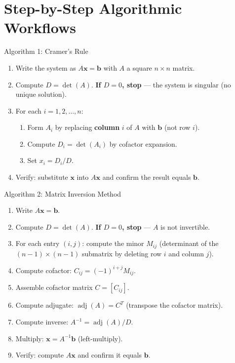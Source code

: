 \documentclass[12pt,a4paper]{article}
\begin{document}
\section{Step-by-Step Algorithmic Workflows}

\begin{learnbox}{Algorithm 1: Cramer's Rule}
\begin{enumerate}[noitemsep]
  \item Write the system as \(A\mathbf{x} = \mathbf{b}\) with \(A\) a square \(n\times n\) matrix.
  \item Compute \(D = \det(A)\). \textbf{If \(D = 0\), stop} --- the system is singular (no unique solution).
  \item For each \(i = 1, 2, \ldots, n\):
  \begin{enumerate}[noitemsep, label=\alph*.]
    \item Form \(A_i\) by replacing \textbf{column} \(i\) of \(A\) with \(\mathbf{b}\) (not row \(i\)).
    \item Compute \(D_i = \det(A_i)\) by cofactor expansion.
    \item Set \(x_i = D_i / D\).
  \end{enumerate}
  \item Verify: substitute \(\mathbf{x}\) into \(A\mathbf{x}\) and confirm the result equals \(\mathbf{b}\).
\end{enumerate}
\end{learnbox}

\begin{learnbox}{Algorithm 2: Matrix Inversion Method}
\begin{enumerate}[noitemsep]
  \item Write \(A\mathbf{x} = \mathbf{b}\).
  \item Compute \(D = \det(A)\). \textbf{If \(D = 0\), stop} --- \(A\) is not invertible.
  \item For each entry \((i,j)\): compute the minor \(M_{ij}\) (determinant of the \((n-1)\times(n-1)\) submatrix by deleting row \(i\) and column \(j\)).
  \item Compute cofactor: \(C_{ij} = (-1)^{i+j} M_{ij}\).
  \item Assemble cofactor matrix \(C = [C_{ij}]\).
  \item Compute adjugate: \(\operatorname{adj}(A) = C^{T}\) (transpose the cofactor matrix).
  \item Compute inverse: \(A^{-1} = \operatorname{adj}(A) / D\).
  \item Multiply: \(\mathbf{x} = A^{-1}\mathbf{b}\) (left-multiply).
  \item Verify: compute \(A\mathbf{x}\) and confirm it equals \(\mathbf{b}\).
\end{enumerate}
\end{learnbox}
\end{document}
